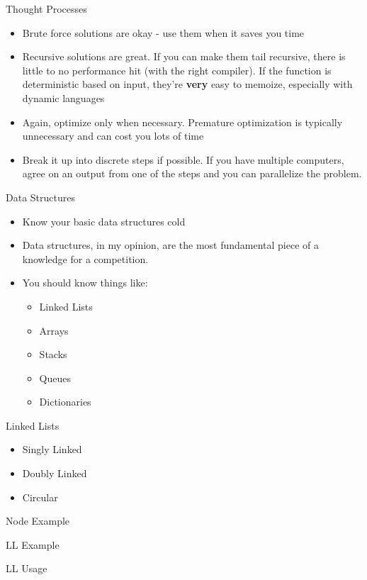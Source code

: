 \documentclass{beamer}
\begin{document}
\begin{frame}{Thought Processes}
  \begin{centering}
    \begin{itemize}
      \item Brute force solutions are okay - use them when it saves you time
      \item Recursive solutions are great. If you can make them tail recursive, there is little to no performance hit (with the right compiler). If the function is deterministic based on input, they're \textbf{very} easy to memoize, especially with dynamic languages
      \item Again, optimize only when necessary. Premature optimization is typically unnecessary and can cost you lots of time
      \item Break it up into discrete steps if possible. If you have multiple computers, agree on an output from one of the steps and you can parallelize the problem.
    \end{itemize}
  \end{centering}
\end{frame}

\begin{frame}{Data Structures}
  \begin{centering}
    \begin{itemize}
      \item Know your basic data structures cold
      \item Data structures, in my opinion, are the most fundamental piece of a knowledge for a competition.
      \item You should know things like:
      \begin{itemize}
        \item Linked Lists
        \item Arrays
        \item Stacks
        \item Queues
        \item Dictionaries
      \end{itemize}
    \end{itemize}
  \end{centering}
\end{frame}

\begin{frame}{Linked Lists}
  \begin{centering}
    \begin{itemize}
      \item Singly Linked
      \item Doubly Linked
      \item Circular
    \end{itemize}
  \end{centering}
\end{frame}

\begin{frame}{Node Example}
  
\end{frame}

\begin{frame}{LL Example}
  
\end{frame}

\begin{frame}{LL Usage}
  
\end{frame}
\end{document}
